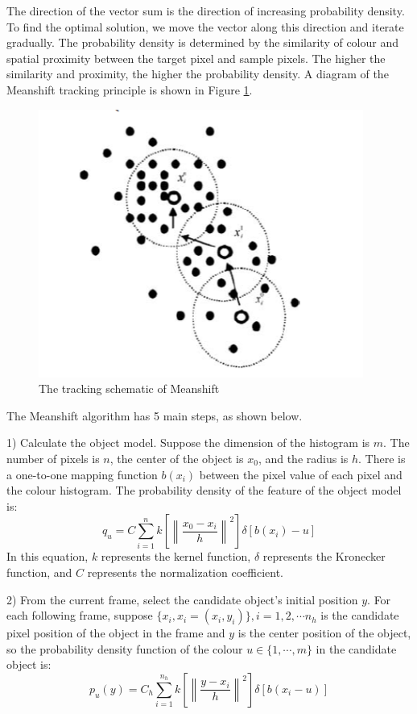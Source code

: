 \documentclass[12pt]{article}
\begin{document}
The direction of the vector sum is the direction of increasing probability density. To find the optimal solution, we move the vector along this direction and iterate gradually. The probability density is determined by the similarity of colour and spatial proximity between the target pixel and sample pixels. The higher the similarity and proximity, the higher the probability density. A diagram of the Meanshift tracking principle is shown in Figure \ref{Meanshift schematic}.
\begin{figure}[h]
  \centering
    \includegraphics[scale=1]{figures/meanshift.png}
    \caption{The tracking schematic of Meanshift}
    \label{Meanshift schematic}
\end{figure}

The Meanshift algorithm has 5 main steps, as shown below.

1)	Calculate the object model.
Suppose the dimension of the histogram is $m$. The number of pixels is $n$, the center of the object is  ${x_0}$, and the radius is $h$. There is a one-to-one mapping function $b({x_i})$ between the pixel value of each pixel and the colour histogram. The probability density of the feature of the object model is:\[{q_u} = C\sum\limits_{i = 1}^n {k[{{\left\| {\frac{{{x_0} - {x_i}}}{h}} \right\|}^2}]} \delta [b({x_i}) - u] \]
In this equation, $k$ represents the kernel function, $\delta$ represents the Kronecker function, and $C$ represents the normalization coefficient.

2) From the current frame, select the candidate object’s initial position $y$. For each following frame, suppose $\{ {x_i},{x_i} = ({x_i},{y_i})\}, i = 1,2, \cdots {n_h}$ is the candidate pixel position of the object in the frame and $y$ is the center position of the object, so the probability density function of the colour $u \in \{ 1, \cdots ,m\} $ in the candidate object is:\[{p_u}(y) = {C_h}\sum\limits_{i = 1}^{{n_h}} {k[{{\left\| {\frac{{y - {x_i}}}{h}} \right\|}^2}]} \delta [b({x_i} - u)]\]
\end{document}
